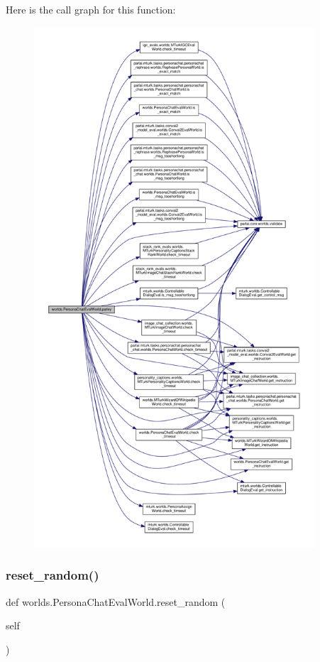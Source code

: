 Here is the call graph for this function\+:
\nopagebreak
\begin{figure}[H]
\begin{center}
\leavevmode
\includegraphics[height=550pt]{classworlds_1_1PersonaChatEvalWorld_ac72940bb2474528d1cc51661d4db3b85_cgraph}
\end{center}
\end{figure}
\mbox{\label{classworlds_1_1PersonaChatEvalWorld_a74d31d5c4581214ceebabfaf7d48f793}} 
\subsubsection{\texorpdfstring{reset\+\_\+random()}{reset\_random()}}
{\footnotesize\ttfamily def worlds.\+Persona\+Chat\+Eval\+World.\+reset\+\_\+random (\begin{DoxyParamCaption}\item[{}]{self }\end{DoxyParamCaption})}



